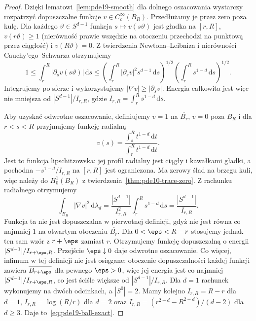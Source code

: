 \begin{proof}
Dzięki lematowi~\ref{lem:pde19-smooth} dla dolnego
oszacowania wystarczy rozpatrzyć dopuszczalne funkcje
$v\in C_c^\infty(B_R)$. Przedłużamy je przez zero poza
kulę. Dla każdego $\vartheta\in S^{d-1}$ funkcja
$s\mapsto v(s\vartheta)$ jest gładka na $[r,R]$,
$v(r\vartheta)\ge1$ (nierówność prawie wszędzie na
otoczeniu przechodzi na punktową przez ciągłość)
i $v(R\vartheta)=0$. Z twierdzenia Newtona--Leibniza
i nierówności Cauchy'ego--Schwarza otrzymujemy
\[
 1\le\int_r^R|\partial_sv(s\vartheta)|\,\mathrm ds
 \le\left(\int_r^R|\partial_sv|^2s^{d-1}\,\mathrm ds\right)^{1/2}
 \left(\int_r^R s^{1-d}\,\mathrm ds\right)^{1/2}.
\]
Integrujemy po sferze i wykorzystujemy
$|\nabla v|\ge|\partial_sv|$. Energia całkowita jest
więc nie mniejsza od
$|S^{d-1}|/I_{r,R}$, gdzie
$I_{r,R}=\int_r^R s^{1-d}\,\mathrm ds$.

Aby uzyskać odwrotne oszacowanie, definiujemy $v=1$
na $\overline{B_r}$, $v=0$ poza $B_R$ i dla $r<s<R$
przyjmujemy funkcję radialną
\[
 v(s)=\frac{\displaystyle\int_s^R t^{1-d}\,\mathrm dt}
 {\displaystyle\int_r^R t^{1-d}\,\mathrm dt}.
\]
Jest to funkcja lipschitzowska: jej profil radialny
jest ciągły i kawałkami gładki, a pochodna
$-s^{1-d}/I_{r,R}$ na $[r,R]$ jest ograniczona.
Ma zerowy ślad na brzegu kuli, więc należy do $H_0^1(B_R)$
z twierdzenia~\ref{thm:pde10-trace-zero}.
Z rachunku radialnego otrzymujemy
\[
 \int_{B_R}|\nabla v|^2\,\mathrm d\lambda_d
 =\frac{|S^{d-1}|}{I_{r,R}^2}\int_r^R s^{1-d}\,\mathrm ds
 =\frac{|S^{d-1}|}{I_{r,R}}.
\]
Funkcja ta nie jest dopuszczalna w pierwotnej definicji,
gdyż nie jest równa co najmniej $1$ na otwartym otoczeniu
$\overline{B_r}$. Dla $0<\eps<R-r$ stosujemy jednak
ten sam wzór z $r+\eps$ zamiast $r$. Otrzymujemy
funkcję dopuszczalną o energii $|S^{d-1}|/I_{r+\eps,R}$.
Przejście $\eps\downarrow0$ daje odwrotne oszacowanie.
Co więcej, infimum w tej definicji nie jest osiągane:
otoczenie dopuszczalności każdej funkcji zawiera
$\overline{B_{r+\eps}}$ dla pewnego $\eps>0$, więc jej
energia jest co najmniej $|S^{d-1}|/I_{r+\eps,R}$,
co jest ściśle większe od $|S^{d-1}|/I_{r,R}$.
Dla $d=1$ rachunek wykonujemy na dwóch odcinkach,
a $|S^0|=2$. Mamy kolejno
$I_{r,R}=R-r$ dla $d=1$, $I_{r,R}=\log(R/r)$ dla $d=2$
oraz $I_{r,R}=(r^{2-d}-R^{2-d})/(d-2)$ dla $d\ge3$.
Daje to~\eqref{eq:pde19-ball-exact}.
\end{proof}

